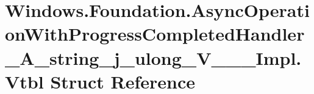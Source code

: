 \hypertarget{struct_windows_1_1_foundation_1_1_async_operation_with_progress_completed_handler___a__string__j__ulong___v_______impl_1_1_vtbl}{}\section{Windows.\+Foundation.\+Async\+Operation\+With\+Progress\+Completed\+Handler\+\_\+\+A\+\_\+string\+\_\+j\+\_\+ulong\+\_\+\+V\+\_\+\+\_\+\+\_\+\+Impl.\+Vtbl Struct Reference}
\label{struct_windows_1_1_foundation_1_1_async_operation_with_progress_completed_handler___a__string__j__ulong___v_______impl_1_1_vtbl}
